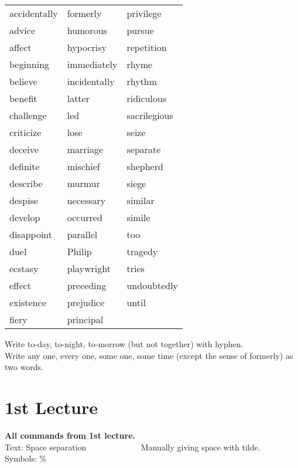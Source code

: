 \documentclass[10pt]{report}
\begin{document}
\begin{table}[!tbh]
    \centering
        \begin{tabular}{m{10em} m{10em} m{10em}}
        
        accidentally & formerly & privilege\\
advice &humorous &pursue\\
affect &hypocrisy &repetition\\
beginning &immediately &rhyme\\
believe &incidentally &rhythm\\
benefit &latter &ridiculous\\
challenge &led &sacrilegious\\
criticize &lose &seize\\
deceive &marriage &separate\\
definite &mischief& shepherd\\
describe &murmur &siege\\
despise &necessary &similar\\
develop &occurred &simile\\
disappoint &parallel &too\\
duel &Philip &tragedy\\
ecstasy &playwright& tries\\
effect &preceding &undoubtedly\\
existence &prejudice &until\\
fiery &principal &\\
 \end{tabular}
 \end{table}
 
 \noindent
 Write to-day, to-night, to-morrow (but not together) with hyphen.\\
 
 \noindent
Write any one, every one, some one, some time (except the sense of formerly) as two
words.

\chapter {1st Lecture}


\noindent
{\bfseries \Large All commands from 1st lecture.}\\


\noindent
{\Large Text:}{\newline}
Space separation ~~~~~~~~~~~~ Manually giving space with tilde.\\


\noindent
{\Large Symbols:}
\%
\\
\end{document}
